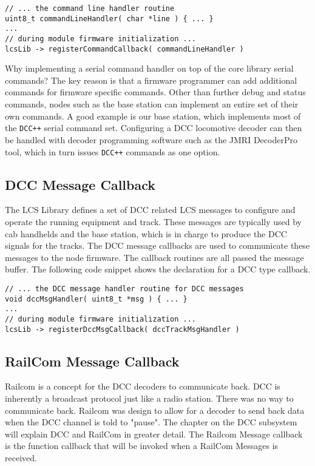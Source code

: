 \lstset{style=codesnippetstyle}
\begin{lstlisting}
// ... the command line handler routine
uint8_t commandLineHandler( char *line ) { ... }
...
// during module firmware initialization ...
lcsLib -> registerCommandCallback( commandLineHandler )
\end{lstlisting}

Why implementing a serial command handler on top of the core library serial commands? The key reason is that a firmware programmer can add additional commands for firmware specific commands. Other than further debug and status commands, nodes such as the base station can implement an entire set of their own commands. A good example is our base station, which implements most of the \texttt{DCC++} serial command set. Configuring a DCC locomotive decoder can then be handled with decoder programming software such as the JMRI DecoderPro tool, which in turn issues \texttt{DCC++} commands as one option.

\subsection{DCC Message Callback}

The LCS Library defines a set of DCC related LCS messages to configure and operate the running equipment and track. These messages are typically used by cab handhelds and the base station, which is in charge to produce the DCC signals for the tracks. The DCC message callbacks are used to communicate these messages to the node firmware. The callback routines are all passed the message buffer. The following code snippet shows the declaration for a DCC type callback.

\lstset{style=codesnippetstyle}
\begin{lstlisting}
// ... the DCC message handler routine for DCC messages
void dccMsgHandler( uint8_t *msg ) { ... }
...
// during module firmware initialization ...
lcsLib -> registerDccMsgCallback( dccTrackMsgHandler )
\end{lstlisting}

\subsection{RailCom Message Callback}

Railcom is a concept for the DCC decoders to communicate back. DCC is inherently a broadcast protocol just like a radio station. There was no way to communicate back.  Railcom was design to allow for a decoder to send back data when the DCC channel is told to "pause". The chapter on the DCC subsystem will explain DCC and RailCom in greater detail. The Railcom Message callback is the function callback that will be invoked when a RailCom Messages is received.

